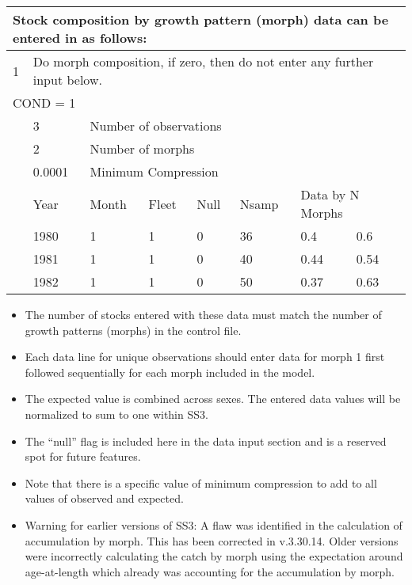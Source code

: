 \begin{center}
	\begin{tabular}{p{1.1cm} p{1.1cm} p{1.1cm} p{1.1cm} p{1.1cm} p{1.1cm} p{1.1cm} p{3.5cm}}
		\multicolumn{8}{l}{Stock composition by growth pattern (morph) data can be entered in as follows:} \\
		\hline
		1 &  \multicolumn{7}{l}{Do morph composition, if zero, then do not enter any further input below.} \Tstrut\Bstrut\\
		\hline
		\multicolumn{8}{l}{COND = 1} \Tstrut\\ 
		& 3 & \multicolumn{6}{l}{Number of observations} \Bstrut\\
		\hline
		& 2 & \multicolumn{6}{l}{Number of morphs} \Tstrut\Bstrut\\
		\hline
		& 0.0001 & \multicolumn{6}{l}{Minimum Compression} \Tstrut\Bstrut\\
		\hline
		& Year & Month & Fleet & Null & Nsamp & \multicolumn{2}{l}{Data by N Morphs} \Tstrut\Bstrut\\
		\hline
		& 1980 & 1 & 1 & 0 & 36 & 0.4 & 0.6 \Tstrut\\
		& 1981 & 1 & 1 & 0 & 40 & 0.44 & 0.54 \\
		& 1982 & 1 & 1 & 0 & 50 & 0.37 & 0.63 \Bstrut\\
		\hline
	\end{tabular}
\end{center}

\begin{itemize}
	\item The number of stocks entered with these data must match the number of growth patterns (morphs) in the control file.
	\item Each data line for unique observations should enter data for morph 1 first followed sequentially for each morph included in the model.
	\item The expected value is combined across sexes. The entered data values will be normalized to sum to one within SS3.
	\item The ``null'' flag is included here in the data input section and is a reserved spot for future features. 
	\item Note that there is a specific value of minimum compression to add to all values of observed and expected.
	\item Warning for earlier versions of SS3: A flaw was identified in the calculation of accumulation by morph. This has been corrected in v.3.30.14. Older versions were incorrectly calculating the catch by morph using the expectation around age-at-length which already was accounting for the accumulation by morph.   
\end{itemize}

